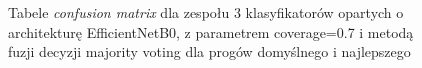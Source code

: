 \documentclass[polish,12pt]{aghthesis}
\begin{document}
\begin{figure}[H]
    \begin{adjustbox}{minipage=1.0\paperwidth, pagecenter}
    \centering
    \qquad
    \end{adjustbox}
    \label{fig:eff-ens-3-0.7-maj-thresh-matrices}
    \caption{Tabele \textit{confusion matrix} dla zespołu 3 klasyfikatorów opartych o architekturę EfficientNetB0, z parametrem coverage=0.7 i metodą fuzji decyzji majority voting dla progów domyślnego i najlepszego}
\end{figure}
\end{document}
